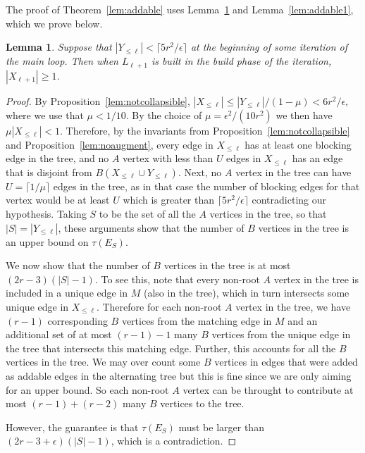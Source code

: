\documentclass[11pt]{article}
\newtheorem{lemma}[theorem]{Lemma}
\theoremstyle{definition}
\theoremstyle{remark}
\begin{document}
The proof of Theorem~\ref{lem:addable} uses Lemma~\ref{lem:addable0} and Lemma~\ref{lem:addable1}, which we prove below.

\begin{lemma}\label{lem:addable0}
  Suppose that $|Y_{\leq \ell}| < \lceil 5r^2/\epsilon \rceil$ at the beginning of some iteration of the main loop. Then when $L_{\ell+1}$ is built in the build phase of the iteration, $|X_{\ell+1}| \geq 1$.
\end{lemma}
\begin{proof}
  By Proposition~\ref{lem:notcollapsible},
  $|X_{\leq \ell}| \leq |Y_{\leq \ell}|/(1-\mu) < 6 r^2/\epsilon,$
  where we use that $\mu < 1/10$. By the choice of
  $\mu = \epsilon^2/(10r^2)$ we then have $\mu|X_{\leq \ell}| <
  1$. Therefore, by the invariants from
  Proposition~\ref{lem:notcollapsible} and
  Proposition~\ref{lem:noaugment}, every edge in $X_{\leq \ell}$ has
  at least one blocking edge in the tree, and no $A$ vertex with less
  than $U$ edges in $X_{\leq \ell}$ has an edge that is disjoint from
  $B(X_{\leq \ell} \cup Y_{\leq \ell})$. Next, no $A$ vertex in the
  tree can have $U = \lceil 1/\mu \rceil$ edges in the tree, as in
  that case the number of blocking edges for that vertex would be at
  least $U$ which is greater than $\lceil 5r^2/\epsilon \rceil$
  contradicting our hypothesis. Taking $S$ to be the set of all the
  $A$ vertices in the tree, so that $|S| = |Y_{\leq \ell}|$, these
  arguments show that the number of $B$ vertices in the tree is an
  upper bound on $\tau(E_S)$.

  We now show that the number of $B$ vertices in the tree is at most
  $(2r-3)(|S|-1)$. To see this, note that every non-root $A$ vertex in
  the tree is included in a unique edge in $M$ (also in the tree),
  which in turn intersects some unique edge in $X_{\leq
    \ell}$. Therefore for each non-root $A$ vertex in the tree, we
  have $(r-1)$ corresponding $B$ vertices from the matching edge in
  $M$ and an additional set of at most $(r-1)-1$ many $B$ vertices from the
  unique edge in the tree that intersects this matching edge. Further,
  this accounts for all the $B$ vertices in the tree. We may over
  count some $B$ vertices in edges that were added as addable edges in
  the alternating tree but this is fine since we are only aiming for
  an upper bound. So each non-root $A$ vertex can be throught to
  contribute at most $(r-1) + (r-2)$ many $B$ vertices to the tree.

  However, the guarantee is that $\tau(E_S)$ must be larger than
  $(2r-3+\epsilon)(|S|-1)$, which is a contradiction.
\end{proof}
\end{document}

